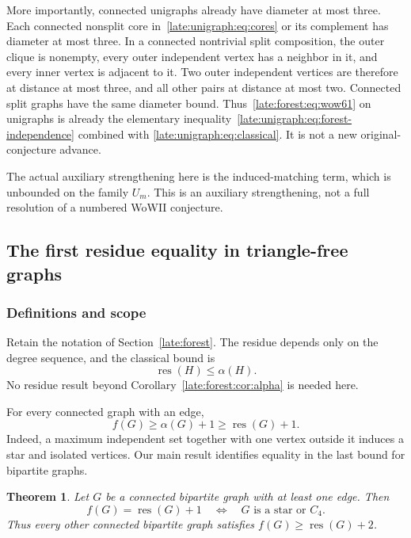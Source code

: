 \documentclass[11pt,a4paper]{article}
\newtheorem{theorem}{Theorem}[section]
\theoremstyle{definition}\newtheorem{definition}[theorem]{Definition}
\theoremstyle{remark}\newtheorem{remark}[theorem]{Remark}
\newcommand{\res}{\operatorname{res}}
\begin{document}
More importantly, connected unigraphs already have diameter at most
three. Each connected nonsplit core in~\eqref{late:unigraph:eq:cores} or its complement
has diameter at most three. In a connected nontrivial split composition,
the outer clique is nonempty, every outer independent vertex has a
neighbor in it, and every inner vertex is adjacent to it. Two outer
independent vertices are therefore at distance at most three, and all
other pairs at distance at most two. Connected split graphs have the same
diameter bound. Thus~\eqref{late:forest:eq:wow61} on unigraphs is already the elementary
inequality~\eqref{late:unigraph:eq:forest-independence} combined with
\eqref{late:unigraph:eq:classical}. It is not a new original-conjecture advance.

The actual auxiliary strengthening here is the induced-matching term,
which is unbounded on the family $U_m$. This is an auxiliary strengthening, not a full resolution of a numbered
WoWII conjecture.


\subsection{The first residue equality in triangle-free graphs}\label{late:equality}

\subsubsection{Definitions and scope}
Retain the notation of Section~\ref{late:forest}. The residue depends
only on the degree sequence, and the classical bound is
\begin{equation}\label{late:equality:eq:res-alpha}
 \res(H)\le\alpha(H).
\end{equation}
No residue result beyond Corollary~\ref{late:forest:cor:alpha} is needed here.

For every connected graph with an edge,
\begin{equation}\label{late:equality:eq:basic}
 f(G)\ge\alpha(G)+1\ge\res(G)+1.
\end{equation}
Indeed, a maximum independent set together with one vertex outside it
induces a star and isolated vertices. Our main result identifies equality
in the last bound for bipartite graphs.

\begin{theorem}\label{late:equality:thm:main}
Let $G$ be a connected bipartite graph with at least one edge. Then
\[
 f(G)=\res(G)+1
 \quad\Longleftrightarrow\quad
 G\text{ is a star or }C_4.
\]
Thus every other connected bipartite graph satisfies
$f(G)\ge\res(G)+2$.
\end{theorem}
\end{document}
